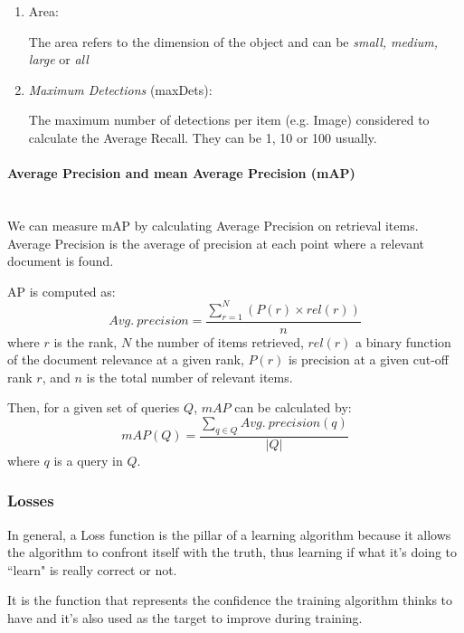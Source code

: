 \begin{enumerate}
	\item Area:
	
	The area refers to the dimension of the object and can be \emph{small, medium, large} or \emph{all}

	\item \emph{Maximum Detections} (maxDets):
	
	The maximum number of detections per item (e.g. Image) considered to calculate the Average Recall. They can be 1, 10 or 100 usually.
	
\end{enumerate}


\paragraph{Average Precision and mean Average Precision (mAP) }
\ \\
We can measure mAP by calculating Average Precision on retrieval items. Average Precision is the average of precision at each point where a relevant document is found.

AP is computed as:
\begin{equation}
Avg. \: precision=\frac{\sum_{r=1}^{N}(P(r)\times rel(r))}{n}
\end{equation}
\noindent
where $ r $ is the rank, $ N $ the number of items retrieved, $ rel(r) $ a binary function of the document relevance at a given rank, $ P(r) $ is precision at a given cut-off rank $ r $, and $ n $ is the total number of relevant items.

Then, for a given set of queries $ Q $, $ mAP $ can be calculated by:
\begin{equation}
mAP(Q)=\frac{\sum_{q\in Q}Avg. \: precision(q)}{|Q|}
\end{equation}
\noindent
where $ q $ is a query in $ Q $.

\subsubsection{Losses}\label{s:losses}

In general, a Loss function is the pillar of a learning algorithm because it allows the algorithm to confront itself with the truth, thus learning if what it's doing to “learn" is really correct or not.

It is the function that represents the confidence the training algorithm thinks to have and it's also used as the target to improve during training.


